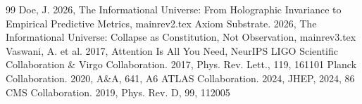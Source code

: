 \documentclass[onecolumn]{aastex631}
\begin{document}
\begin{thebibliography}{99}
 Doe, J. 2026, The Informational Universe: From Holographic Invariance to Empirical Predictive Metrics, mainrev2.tex
 Axiom Substrate. 2026, The Informational Universe: Collapse as Constitution, Not Observation, mainrev3.tex
 Vaswani, A. et al. 2017, Attention Is All You Need, NeurIPS
 LIGO Scientific Collaboration \& Virgo Collaboration. 2017, Phys. Rev. Lett., 119, 161101
 Planck Collaboration. 2020, A\&A, 641, A6
 ATLAS Collaboration. 2024, JHEP, 2024, 86
 CMS Collaboration. 2019, Phys. Rev. D, 99, 112005
\end{thebibliography}
\end{document}
